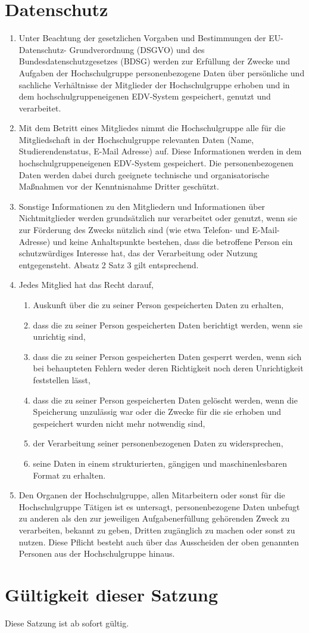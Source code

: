 \documentclass[11pt]{article}
\begin{document}
\section{Datenschutz}
\begin{enumerate}
	\item Unter Beachtung der gesetzlichen Vorgaben und Bestimmungen der EU-Datenschutz-
	Grundverordnung (DSGVO) und des Bundesdatenschutzgesetzes (BDSG) werden zur Erfüllung
	der Zwecke und Aufgaben der Hochschulgruppe personenbezogene Daten über persönliche und
	sachliche Verhältnisse der Mitglieder der Hochschulgruppe erhoben und in dem
	hochschulgruppeneigenen EDV-System gespeichert, genutzt und verarbeitet.
	\item Mit dem Betritt eines Mitgliedes nimmt die Hochschulgruppe alle für die Mitgliedschaft in der
	Hochschulgruppe relevanten Daten (Name, Studierendenstatus, E-Mail Adresse) auf. Diese Informationen
	werden in dem hochschulgruppeneigenen EDV-System gespeichert. Die personenbezogenen
	Daten werden dabei durch geeignete technische und organisatorische Maßnahmen vor der
	Kenntnisnahme Dritter geschützt.
	\item Sonstige Informationen zu den Mitgliedern und Informationen über Nichtmitglieder werden
	grundsätzlich nur verarbeitet oder genutzt, wenn sie zur Förderung des Zwecks nützlich sind
	(wie etwa Telefon- und E-Mail-Adresse) und keine Anhaltspunkte bestehen, dass die betroffene
	Person ein schutzwürdiges Interesse hat, das der Verarbeitung oder Nutzung entgegensteht.
	Absatz 2 Satz 3 gilt entsprechend.
	\item Jedes Mitglied hat das Recht darauf,
	\begin{enumerate}
		\item Auskunft über die zu seiner Person gespeicherten Daten zu erhalten,
		\item dass die zu seiner Person gespeicherten Daten berichtigt werden, wenn sie unrichtig sind,
		\item dass die zu seiner Person gespeicherten Daten gesperrt werden, wenn sich bei behaupteten
		Fehlern weder deren Richtigkeit noch deren Unrichtigkeit feststellen lässt,
		\item dass die zu seiner Person gespeicherten Daten gelöscht werden, wenn die Speicherung
		unzulässig war oder die Zwecke für die sie erhoben und gespeichert wurden nicht mehr
		notwendig sind,
		\item der Verarbeitung seiner personenbezogenen Daten zu widersprechen,
		\item seine Daten in einem strukturierten, gängigen und maschinenlesbaren Format zu erhalten.
	\end{enumerate}
	\item Den Organen der Hochschulgruppe, allen Mitarbeitern oder sonst für die Hochschulgruppe
	Tätigen ist es untersagt, personenbezogene Daten unbefugt zu anderen als den zur jeweiligen
	Aufgabenerfüllung gehörenden Zweck zu verarbeiten, bekannt zu geben, Dritten zugänglich zu
	machen oder sonst zu nutzen. Diese Pflicht besteht auch über das Ausscheiden der oben
	genannten Personen aus der Hochschulgruppe hinaus.
\end{enumerate}
\section{Gültigkeit dieser Satzung}
Diese Satzung ist ab sofort gültig.
\end{document}
